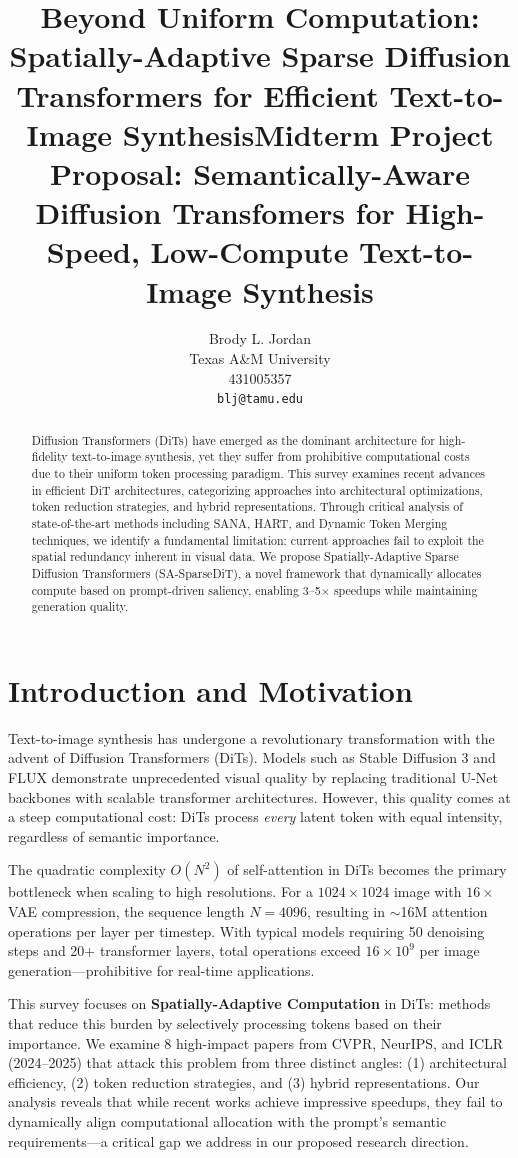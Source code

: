 \documentclass{article}
\title{Beyond Uniform Computation:\\
Spatially-Adaptive Sparse Diffusion Transformers for Efficient Text-to-Image Synthesis}
\title{Midterm Project Proposal: Semantically-Aware Diffusion Transfomers for High-Speed, Low-Compute Text-to-Image Synthesis}
\author{
Brody L. Jordan \\
Texas A\&M University \\
431005357 \\ 
\texttt{blj@tamu.edu}
}
\begin{document}
\maketitle

\begin{abstract}
    Diffusion Transformers (DiTs) have emerged as the dominant architecture for
    high-fidelity text-to-image synthesis, yet they suffer from prohibitive computational
    costs due to their uniform token processing paradigm. This survey examines recent
    advances in efficient DiT architectures, categorizing approaches into architectural
    optimizations, token reduction strategies, and hybrid representations. Through critical
    analysis of state-of-the-art methods including SANA, HART, and Dynamic Token Merging
    techniques, we identify a fundamental limitation: current approaches fail to exploit
    the spatial redundancy inherent in visual data. We propose Spatially-Adaptive Sparse
    Diffusion Transformers (SA-SparseDiT), a novel framework that dynamically allocates
    compute based on prompt-driven saliency, enabling 3--5$\times$ speedups while
    maintaining generation quality.
\end{abstract}

\section{Introduction and Motivation}

Text-to-image synthesis has undergone a revolutionary transformation with the advent of
Diffusion Transformers (DiTs). Models such as Stable Diffusion 3 \cite{esser2024scaling}
and FLUX \cite{labs2024flux} demonstrate unprecedented visual quality by replacing
traditional U-Net backbones with scalable transformer architectures. However, this
quality comes at a steep computational cost: DiTs process \textit{every} latent token
with equal intensity, regardless of semantic importance.

The quadratic complexity $O(N^2)$ of self-attention in DiTs becomes the primary
bottleneck when scaling to high resolutions. For a $1024 \times 1024$ image with
$16\times$ VAE compression, the sequence length $N = 4096$, resulting in $\sim$16M
attention operations per layer per timestep. With typical models requiring 50
denoising steps and 20+ transformer layers, total operations exceed $16 \times 10^9$
per image generation—prohibitive for real-time applications.

This survey focuses on \textbf{Spatially-Adaptive Computation} in DiTs: methods that
reduce this burden by selectively processing tokens based on their importance.
We examine 8 high-impact papers from CVPR, NeurIPS, and ICLR (2024--2025) that
attack this problem from three distinct angles: (1) architectural efficiency,
(2) token reduction strategies, and (3) hybrid representations. Our analysis
reveals that while recent works achieve impressive speedups, they fail to
dynamically align computational allocation with the prompt's semantic requirements—a
critical gap we address in our proposed research direction.
\end{document}
